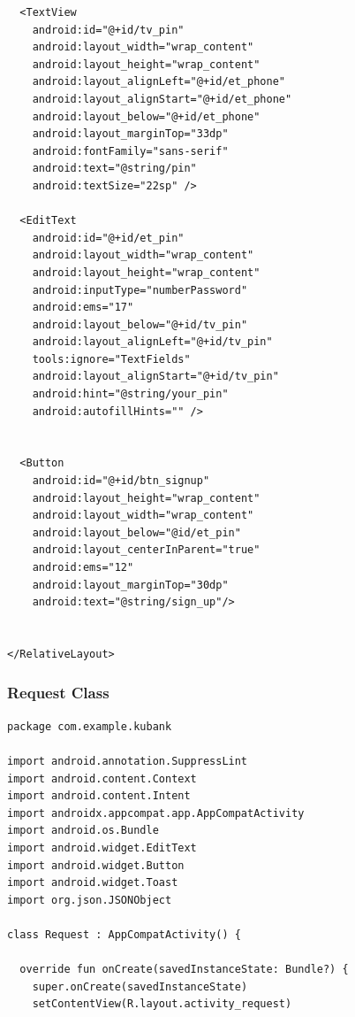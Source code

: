 \documentclass[11pt, a4paper]{article}
\begin{document}
\begin{appendices}
\begin{lstlisting}
  <TextView
    android:id="@+id/tv_pin"
    android:layout_width="wrap_content"
    android:layout_height="wrap_content"
    android:layout_alignLeft="@+id/et_phone"
    android:layout_alignStart="@+id/et_phone"
    android:layout_below="@+id/et_phone"
    android:layout_marginTop="33dp"
    android:fontFamily="sans-serif"
    android:text="@string/pin"
    android:textSize="22sp" />

  <EditText
    android:id="@+id/et_pin"
    android:layout_width="wrap_content"
    android:layout_height="wrap_content"
    android:inputType="numberPassword"
    android:ems="17"
    android:layout_below="@+id/tv_pin"
    android:layout_alignLeft="@+id/tv_pin"
    tools:ignore="TextFields"
    android:layout_alignStart="@+id/tv_pin"
    android:hint="@string/your_pin"
    android:autofillHints="" />


  <Button
    android:id="@+id/btn_signup"
    android:layout_height="wrap_content"
    android:layout_width="wrap_content"
    android:layout_below="@id/et_pin"
    android:layout_centerInParent="true"
    android:ems="12"
    android:layout_marginTop="30dp"
    android:text="@string/sign_up"/>


</RelativeLayout>
\end{lstlisting}
\subsubsection{Request Class}
\begin{lstlisting}
package com.example.kubank

import android.annotation.SuppressLint
import android.content.Context
import android.content.Intent
import androidx.appcompat.app.AppCompatActivity
import android.os.Bundle
import android.widget.EditText
import android.widget.Button
import android.widget.Toast
import org.json.JSONObject

class Request : AppCompatActivity() {

  override fun onCreate(savedInstanceState: Bundle?) {
    super.onCreate(savedInstanceState)
    setContentView(R.layout.activity_request)


\end{lstlisting}
\end{appendices}
\end{document}
